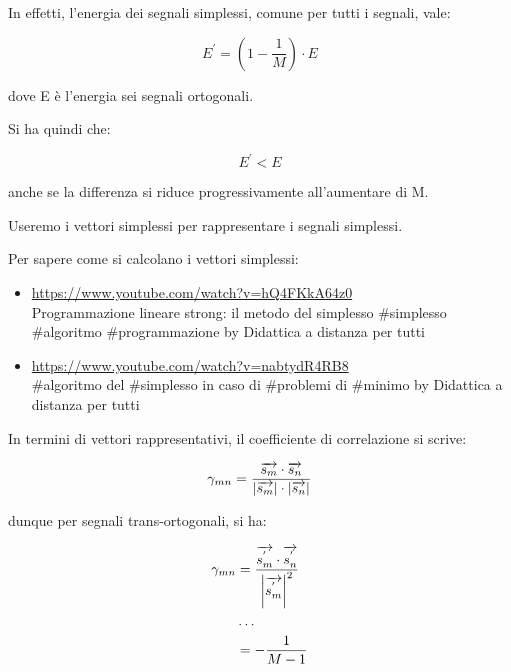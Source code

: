 In effetti, l'energia dei segnali simplessi, comune per tutti i segnali, vale: 

{
    \Large 
    \begin{equation}
        E^{'}
        =
        \left(1 - \frac{1}{M}\right)
        \cdot 
        E
    \end{equation}
}

dove E è l'energia sei segnali ortogonali. \newline 

Si ha quindi che: 

{
    \Large 
    \begin{equation}
        E^{'} < E
    \end{equation}
}

anche se la differenza si riduce progressivamente all'aumentare di M. \newline 

\begin{tcolorbox}
 Useremo i vettori simplessi per rappresentare i segnali simplessi. \newline 

 Per sapere come si calcolano i vettori simplessi: 

 \begin{itemize}
    \item \url{https://www.youtube.com/watch?v=hQ4FKkA64z0} \\ Programmazione lineare strong: il metodo del simplesso \#simplesso \#algoritmo \#programmazione by Didattica a distanza per tutti
    \item \url{https://www.youtube.com/watch?v=nabtydR4RB8} \\ \#algoritmo del \#simplesso in caso di \#problemi di \#minimo by Didattica a distanza per tutti
 \end{itemize}

\end{tcolorbox}


In termini di vettori rappresentativi, il coefficiente di correlazione si scrive: 

{
    \Large 
    \begin{equation}
        \gamma_{mn}
        = 
        \frac{\overrightarrow{s_m} \cdot \overrightarrow{s_n}}{\abs{\overrightarrow{s_m}} \cdot \abs{\overrightarrow{s_n}}}
    \end{equation}
}

dunque per segnali trans-ortogonali, si ha: 

{
    \Large 
    \begin{equation}
        \begin{split}
        \gamma_{mn}
        &= 
        \frac{\overrightarrow{s_m^{'}} \cdot \overrightarrow{s_n^{'}}}{\abs{\overrightarrow{s_m^{'}}}^{2} }
        \\
        &\dots
        \\
        &= 
        - \frac{1}{M - 1}
    \end{split}
    \end{equation}
}

